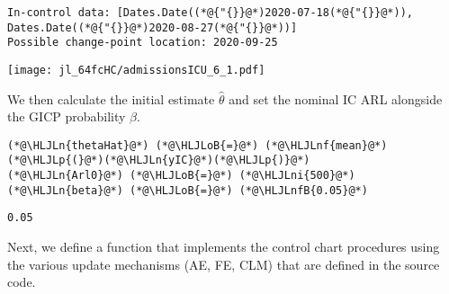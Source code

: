 \documentclass[12pt,a4paper]{article}
\newcommand{\HLJLn}[1]{#1}
\newcommand{\HLJLnf}[1]{\textcolor[RGB]{66,102,213}{#1}}
\newcommand{\HLJLnfB}[1]{\textcolor[RGB]{59,151,46}{#1}}
\newcommand{\HLJLni}[1]{\textcolor[RGB]{59,151,46}{#1}}
\newcommand{\HLJLoB}[1]{\textcolor[RGB]{102,102,102}{\textbf{#1}}}
\newcommand{\HLJLp}[1]{#1}
\begin{document}
\begin{lstlisting}
In-control data: [Dates.Date((*@{"{}}@*)2020-07-18(*@{"{}}@*)), Dates.Date((*@{"{}}@*)2020-08-27(*@{"{}}@*))]
Possible change-point location: 2020-09-25
\end{lstlisting}

\texttt{[image: jl\_64fcHC/admissionsICU\_6\_1.pdf]}

We then calculate the initial estimate $\hat{\theta}$ and set the nominal IC ARL alongside the GICP probability $\beta$.


\begin{lstlisting}
(*@\HLJLn{thetaHat}@*) (*@\HLJLoB{=}@*) (*@\HLJLnf{mean}@*)(*@\HLJLp{(}@*)(*@\HLJLn{yIC}@*)(*@\HLJLp{)}@*)
(*@\HLJLn{Arl0}@*) (*@\HLJLoB{=}@*) (*@\HLJLni{500}@*)
(*@\HLJLn{beta}@*) (*@\HLJLoB{=}@*) (*@\HLJLnfB{0.05}@*)
\end{lstlisting}

\begin{lstlisting}
0.05
\end{lstlisting}


Next, we define a function that implements the control chart procedures using the various update mechanisms (AE, FE, CLM) that are defined in the source code.
\end{document}
